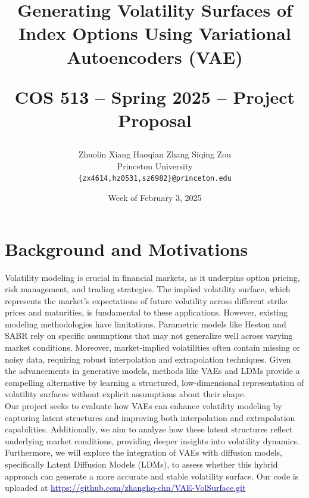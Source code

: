 \documentclass{article}
\title{Generating Volatility Surfaces of Index Options Using Variational Autoencoders (VAE)\\
\begin{large}
COS 513 -- Spring 2025 -- Project Proposal
\end{large} }
\author{%
Zhuolin Xiang \quad Haoqian Zhang \quad Siqing Zou\\
Princeton University \\
\texttt{\{zx4614,hz0531,sz6982\}@princeton.edu}
}
\date{Week of February 3, 2025}
\begin{document}
\maketitle

\section{Background and Motivations}


Volatility modeling is crucial in financial markets, as it underpins option pricing, risk management, and trading strategies. The implied volatility surface, which represents the market's expectations of future volatility across different strike prices and maturities, is fundamental to these applications. However, existing modeling methodologies have limitations. Parametric models like Heston and SABR rely on specific assumptions that may not generalize well across varying market conditions. Moreover, market-implied volatilities often contain missing or noisy data, requiring robust interpolation and extrapolation techniques. Given the advancements in generative models, methods like VAEs and LDMs provide a compelling alternative by learning a structured, low-dimensional representation of volatility surfaces without explicit assumptions about their shape.\\

Our project seeks to evaluate how VAEs can enhance volatility modeling by capturing latent structures and improving both interpolation and extrapolation capabilities. Additionally, we aim to analyze how these latent structures reflect underlying market conditions, providing deeper insights into volatility dynamics. Furthermore, we will explore the integration of VAEs with diffusion models, specifically Latent Diffusion Models (LDMs), to assess whether this hybrid approach can generate a more accurate and stable volatility surface. Our code is uploaded at \href{https://github.com/zhanghq-chn/VAE-VolSurface.git}{\textcolor{blue}{https://github.com/zhanghq-chn/VAE-VolSurface.git}}
\end{document}
